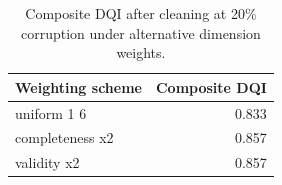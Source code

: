 \begin{table}[H]
  \centering
  \caption{Composite DQI after cleaning at 20\% corruption under alternative dimension weights.}
  \label{tab:dqi-sensitivity}
  \begin{tabular}{@{}lr@{}}
    \toprule
    Weighting scheme & Composite DQI \\
    \midrule
    uniform 1 6 & 0.833 \\
completeness x2 & 0.857 \\
validity x2 & 0.857 \\
    \bottomrule
  \end{tabular}
\end{table}
